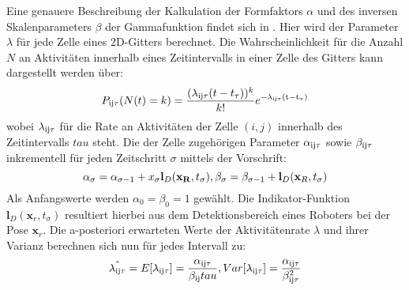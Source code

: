 Eine genauere Beschreibung der Kalkulation der Formfaktors $\alpha$ und des inversen Skalenparameters $\beta$ der Gammafunktion findet sich in \cite{Stuede.2020}. Hier wird der Parameter $\lambda$ für jede Zelle eines 2D-Gitters berechnet. Die Wahrscheinlichkeit
für die Anzahl $N$ an Aktivitäten innerhalb eines Zeitintervalls in einer Zelle des Gitters kann dargestellt werden über:
\begin{equation}
	P_{\mathrm{ij \tau}} (N(t) = k) = \frac{(\lambda_{\mathrm{ij \tau}}(t-t_\tau))^k}{k!} e^{\mathrm{-\lambda_{\mathrm{ij\tau}} (t- t_\tau)}}
\end{equation}
wobei $\lambda_{\mathrm{ij \tau}}$ für die Rate an Aktivitäten der Zelle $(i,j)$ innerhalb des Zeitintervalls $tau$ steht. Die der Zelle zugehörigen Parameter $\alpha_{\mathrm{ij\tau}}$ sowie $\beta_{\mathrm{ij\tau}}$ inkrementell für jeden Zeitschritt $\sigma$  mittels der Vorschrift:
\begin{equation}
	\alpha_\sigma = \alpha_{\mathrm{\sigma - 1}} + x_\sigma \mathbf{l}_D (\mathbf{x_R}, t_\sigma),  \beta_\sigma = \beta_{\mathrm{\sigma - 1}} + \mathbf{l}_D (\mathbf{x}_R, t_\sigma )
\end{equation}
Als Anfangswerte werden $\alpha_0 = \beta_0 = 1 $ gewählt. Die Indikator-Funktion $\boldsymbol{l}_D (\boldsymbol{x}_r, t_\sigma)$ resultiert hierbei aus dem Detektionsbereich eines Roboters bei der Pose $\boldsymbol{x}_r$. Die a-posteriori erwarteten Werte der Aktivitätenrate $\lambda$ und ihrer Varianz berechnen sich nun für jedes Intervall zu:
\begin{equation}
	\hat{\lambda_{\mathrm{ij\tau}}} = E[\lambda_{\mathrm{ij\tau}}] = \frac{\alpha_{\mathrm{ij\tau}}}{\beta_{\mathrm{ij}}tau},	Var[\lambda_{\mathrm{ij\tau}}] = \frac{\alpha_{\mathrm{ij\tau}}}{\beta_{\mathrm{ij\tau}}^2}
\end{equation}



